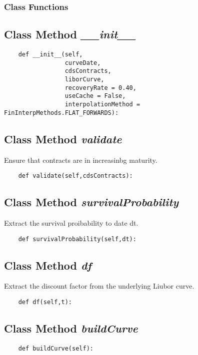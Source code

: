 \documentclass[twoside,11pt]{book}
\begin{document}
\subsubsection{Class Functions}

\subsection{Class Method {\it \_\_init\_\_}}


\begin{lstlisting}
    def __init__(self,
                 curveDate,
                 cdsContracts,
                 liborCurve,
                 recoveryRate = 0.40,
                 useCache = False,
                 interpolationMethod =  FinInterpMethods.FLAT_FORWARDS):
\end{lstlisting}

\subsection{Class Method {\it validate}}
Ensure that contracts are in increasinbg maturity. 

\begin{lstlisting}
    def validate(self,cdsContracts):
\end{lstlisting}

\subsection{Class Method {\it survivalProbability}}
Extract the survival proibability to date dt. 

\begin{lstlisting}
    def survivalProbability(self,dt):
\end{lstlisting}

\subsection{Class Method {\it df}}
Extract the discount factor from the underlying Liubor curve. 

\begin{lstlisting}
    def df(self,t):
\end{lstlisting}

\subsection{Class Method {\it buildCurve}}


\begin{lstlisting}
    def buildCurve(self):
\end{lstlisting}
\end{document}
